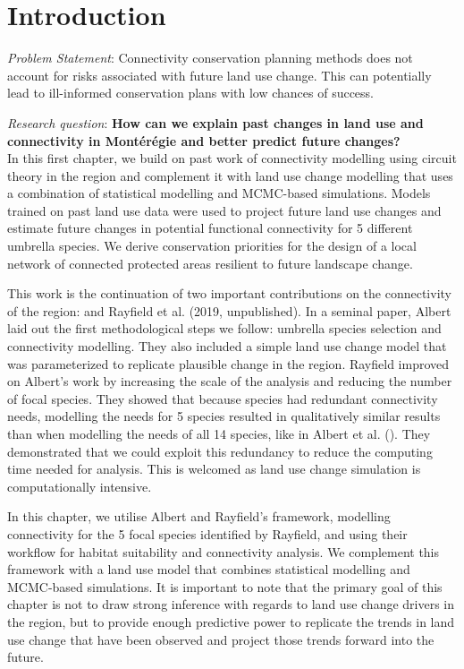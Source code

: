 \section{Introduction}
\textit{Problem Statement}: Connectivity conservation planning methods does not account for risks associated with future land use change. This can potentially lead to ill-informed conservation plans with low chances of success.

\textit{Research question}: \textbf{How can we explain past changes in land use and connectivity in Montérégie and better predict future changes?}\\

In this first chapter, we build on past work of connectivity modelling using circuit theory in the region and complement it with land use change modelling that uses a combination of statistical modelling and MCMC-based simulations. Models trained on past land use data were used to project future land use changes and estimate future changes in potential functional connectivity for 5 different umbrella species. We derive conservation priorities for the design of a local network of connected protected areas resilient to future landscape change.

This work is the continuation of two important contributions on the connectivity of the region: \cite{albert_applying_2017} and Rayfield et al. (2019, unpublished). In a seminal paper, Albert laid out the first methodological steps we follow: umbrella species selection and connectivity modelling. They also included a simple land use change model that was parameterized to replicate plausible change in the region. Rayfield improved on Albert’s work by increasing the scale of the analysis and reducing the number of focal species. They showed that because species had redundant connectivity needs, modelling the needs for 5 species resulted in qualitatively similar results than when modelling the needs of all 14 species, like in Albert et al. (\citeyear{albert_applying_2017}). They demonstrated that we could exploit this redundancy to reduce the computing time needed for analysis. This is welcomed as land use change simulation is computationally intensive.

In this chapter, we utilise Albert and Rayfield’s framework, modelling connectivity for the 5 focal species identified by Rayfield, and using their workflow for habitat suitability and connectivity analysis. We complement this framework with a land use model that combines statistical modelling and MCMC-based simulations. It is important to note that the primary goal of this chapter is not to draw strong inference with regards to land use change drivers in the region, but to provide enough predictive power to replicate the trends in land use change that have been observed and project those trends forward into the future.

